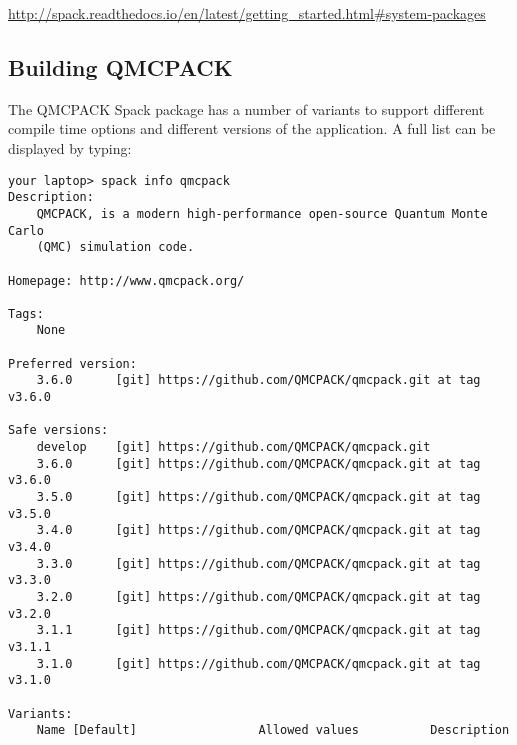 \url{http://spack.readthedocs.io/en/latest/getting_started.html#system-packages}

\subsection{Building QMCPACK}
The QMCPACK Spack package has a number of variants to support different compile time
options and different versions of the application. A full list can be displayed by typing:

\begin{lstlisting}[style=SHELL]
your laptop> spack info qmcpack
Description:
    QMCPACK, is a modern high-performance open-source Quantum Monte Carlo
    (QMC) simulation code.

Homepage: http://www.qmcpack.org/

Tags:
    None

Preferred version:
    3.6.0      [git] https://github.com/QMCPACK/qmcpack.git at tag v3.6.0

Safe versions:
    develop    [git] https://github.com/QMCPACK/qmcpack.git
    3.6.0      [git] https://github.com/QMCPACK/qmcpack.git at tag v3.6.0
    3.5.0      [git] https://github.com/QMCPACK/qmcpack.git at tag v3.5.0
    3.4.0      [git] https://github.com/QMCPACK/qmcpack.git at tag v3.4.0
    3.3.0      [git] https://github.com/QMCPACK/qmcpack.git at tag v3.3.0
    3.2.0      [git] https://github.com/QMCPACK/qmcpack.git at tag v3.2.0
    3.1.1      [git] https://github.com/QMCPACK/qmcpack.git at tag v3.1.1
    3.1.0      [git] https://github.com/QMCPACK/qmcpack.git at tag v3.1.0

Variants:
    Name [Default]                 Allowed values          Description



\end{lstlisting}

